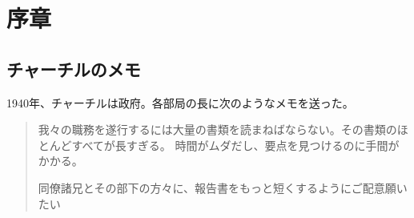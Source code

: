\documentclass{jlreq}
\begin{document}
\section{序章}
\subsection{チャーチルのメモ}
 1940年、チャーチルは政府。各部局の長に次のようなメモを送った。
 \begin{quotation}
    我々の職務を遂行するには大量の書類を読まねばならない。その書類のほとんどすべてが長すぎる。
    時間がムダだし、要点を見つけるのに手間がかかる。

    同僚諸兄とその部下の方々に、報告書をもっと短くするようにご配意願いたい
 \end{quotation}
\end{document}
